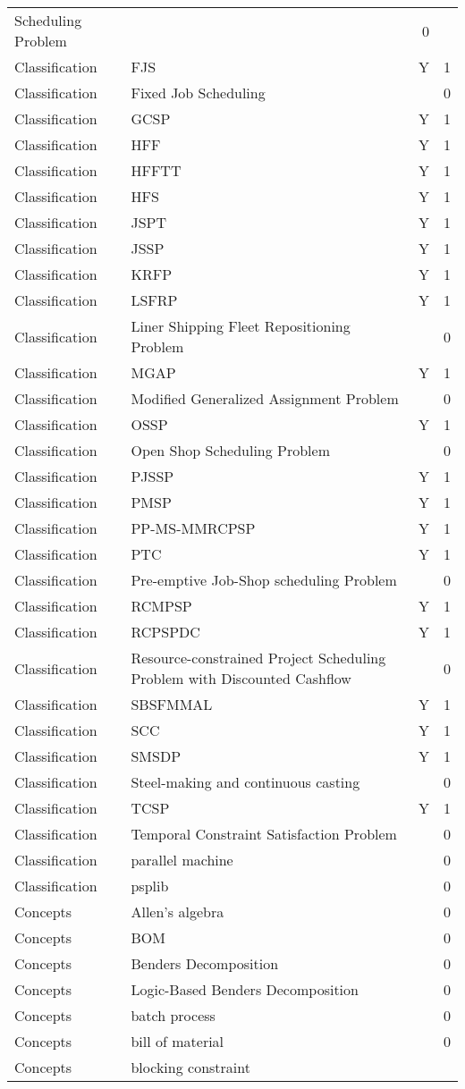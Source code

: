 {\begin{longtable}{lp{10cm}rr}
Scheduling Problem &  & 0\\Classification & FJS & Y & 1\\Classification & Fixed Job Scheduling &  & 0\\Classification & GCSP & Y & 1\\Classification & HFF & Y & 1\\Classification & HFFTT & Y & 1\\Classification & HFS & Y & 1\\Classification & JSPT & Y & 1\\Classification & JSSP & Y & 1\\Classification & KRFP & Y & 1\\Classification & LSFRP & Y & 1\\Classification & Liner Shipping Fleet Repositioning Problem &  & 0\\Classification & MGAP & Y & 1\\Classification & Modified Generalized Assignment Problem &  & 0\\Classification & OSSP & Y & 1\\Classification & Open Shop Scheduling Problem &  & 0\\Classification & PJSSP & Y & 1\\Classification & PMSP & Y & 1\\Classification & PP-MS-MMRCPSP & Y & 1\\Classification & PTC & Y & 1\\Classification & Pre-emptive Job-Shop scheduling Problem &  & 0\\Classification & RCMPSP & Y & 1\\Classification & RCPSPDC & Y & 1\\Classification & Resource-constrained Project Scheduling Problem with Discounted Cashflow &  & 0\\Classification & SBSFMMAL & Y & 1\\Classification & SCC & Y & 1\\Classification & SMSDP & Y & 1\\Classification & Steel-making and continuous casting &  & 0\\Classification & TCSP & Y & 1\\Classification & Temporal Constraint Satisfaction Problem &  & 0\\Classification & parallel machine &  & 0\\Classification & psplib &  & 0\\Concepts & Allen's algebra &  & 0\\Concepts & BOM &  & 0\\Concepts & Benders Decomposition &  & 0\\Concepts & Logic-Based Benders Decomposition &  & 0\\Concepts & batch process &  & 0\\Concepts & bill of material &  & 0\\Concepts & blocking constraint 
\end{longtable}}
